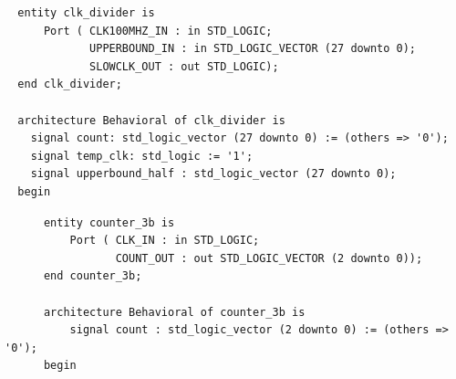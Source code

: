 \documentclass[11pt]{article}
\newenvironment{code}{\captionsetup{type=listing}}{}
\begin{document}
\vspace*{1cm}

\begin{code}
  \begin{verbatim}
  entity clk_divider is
      Port ( CLK100MHZ_IN : in STD_LOGIC;
             UPPERBOUND_IN : in STD_LOGIC_VECTOR (27 downto 0);
             SLOWCLK_OUT : out STD_LOGIC);
  end clk_divider;

  architecture Behavioral of clk_divider is
    signal count: std_logic_vector (27 downto 0) := (others => '0');
    signal temp_clk: std_logic := '1';
    signal upperbound_half : std_logic_vector (27 downto 0);
  begin

  \end{verbatim}
  \captionsetup{belowskip=0pt}
  \label{code:case_io}
\end{code}

\vspace*{1cm}

\begin{code}
  \begin{verbatim}
      entity counter_3b is
          Port ( CLK_IN : in STD_LOGIC;
                 COUNT_OUT : out STD_LOGIC_VECTOR (2 downto 0));
      end counter_3b;

      architecture Behavioral of counter_3b is
          signal count : std_logic_vector (2 downto 0) := (others => '0');
      begin

  \end{verbatim}
  \captionsetup{belowskip=0pt}
  \label{code:case}

\end{code}

\vspace*{1cm}
\end{document}
